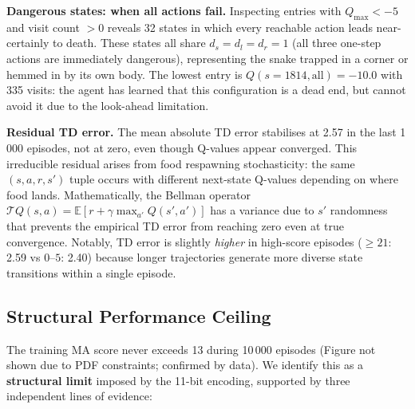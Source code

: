 \documentclass[10pt,conference]{IEEEtran}
\begin{document}
\textbf{Dangerous states: when all actions fail.}
Inspecting entries with $Q_{\max}<-5$ and visit count $>0$
reveals 32 states in which every reachable action leads
near-certainly to death.
These states all share $d_s=d_l=d_r=1$ (all three one-step
actions are immediately dangerous), representing the snake
trapped in a corner or hemmed in by its own body.
The lowest entry is $Q(s=1814,\text{all})=-10.0$ with 335 visits:
the agent has learned that this configuration is a dead end, but
cannot avoid it due to the look-ahead limitation.

\textbf{Residual TD error.}
The mean absolute TD error stabilises at 2.57 in the last 1\,000
episodes, not at zero, even though Q-values appear converged.
This irreducible residual arises from food respawning stochasticity:
the same $(s,a,r,s')$ tuple occurs with different next-state
Q-values depending on where food lands.
Mathematically, the Bellman operator $\mathcal{T}Q(s,a)=
\mathbb{E}[r+\gamma\max_{a'}Q(s',a')]$ has a variance due to
$s'$ randomness that prevents the empirical TD error from reaching
zero even at true convergence.
Notably, TD error is slightly \emph{higher} in high-score episodes
($\geq21$: 2.59 vs $0$--$5$: 2.40) because longer trajectories
generate more diverse state transitions within a single episode.

\subsection{Structural Performance Ceiling}
\label{sec:ceiling}

The training MA score never exceeds 13 during 10\,000 episodes
(Figure not shown due to PDF constraints; confirmed by data).
We identify this as a \textbf{structural limit} imposed by the
11-bit encoding, supported by three independent lines of evidence:
\end{document}
